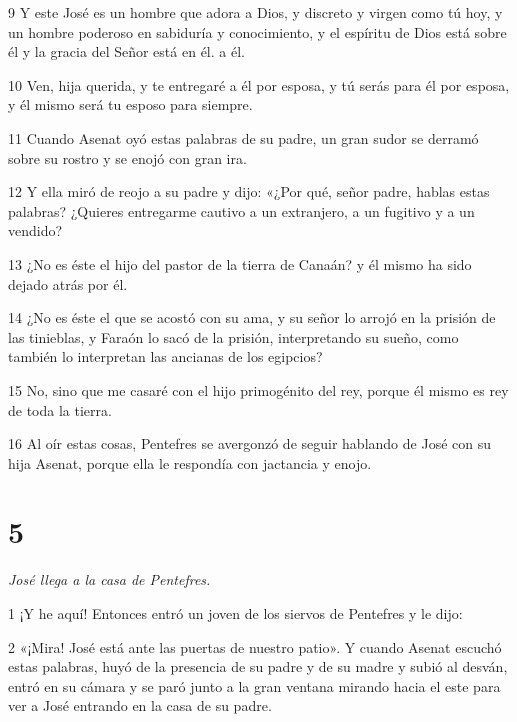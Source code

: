 \par 9 Y este José es un hombre que adora a Dios, y discreto y virgen como tú hoy, y un hombre poderoso en sabiduría y conocimiento, y el espíritu de Dios está sobre él y la gracia del Señor está en él. a él.

\par 10 Ven, hija querida, y te entregaré a él por esposa, y tú serás para él por esposa, y él mismo será tu esposo para siempre.

\par 11 Cuando Asenat oyó estas palabras de su padre, un gran sudor se derramó sobre su rostro y se enojó con gran ira.

\par 12 Y ella miró de reojo a su padre y dijo: «¿Por qué, señor padre, hablas estas palabras? ¿Quieres entregarme cautivo a un extranjero, a un fugitivo y a un vendido?

\par 13 ¿No es éste el hijo del pastor de la tierra de Canaán? y él mismo ha sido dejado atrás por él.

\par 14 ¿No es éste el que se acostó con su ama, y ​​su señor lo arrojó en la prisión de las tinieblas, y Faraón lo sacó de la prisión, interpretando su sueño, como también lo interpretan las ancianas de los egipcios?

\par 15 No, sino que me casaré con el hijo primogénito del rey, porque él mismo es rey de toda la tierra.

\par 16 Al oír estas cosas, Pentefres se avergonzó de seguir hablando de José con su hija Asenat, porque ella le respondía con jactancia y enojo.

\chapter{5}

\textit{José llega a la casa de Pentefres.}

\par 1 ¡Y he aquí! Entonces entró un joven de los siervos de Pentefres y le dijo:

\par 2 «¡Mira! José está ante las puertas de nuestro patio». Y cuando Asenat escuchó estas palabras, huyó de la presencia de su padre y de su madre y subió al desván, entró en su cámara y se paró junto a la gran ventana mirando hacia el este para ver a José entrando en la casa de su padre.

